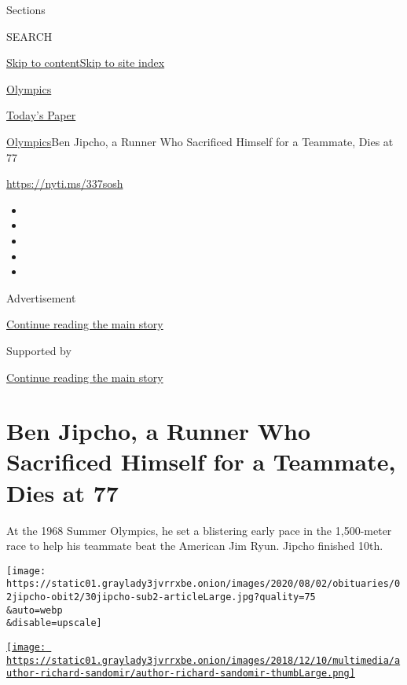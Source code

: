 Sections

SEARCH

\protect\hyperlink{site-content}{Skip to
content}\protect\hyperlink{site-index}{Skip to site index}

\href{https://www.nytimes3xbfgragh.onion/section/sports/olympics}{Olympics}

\href{https://myaccount.nytimes3xbfgragh.onion/auth/login?response_type=cookie\&client_id=vi}{}

\href{https://www.nytimes3xbfgragh.onion/section/todayspaper}{Today's
Paper}

\href{/section/sports/olympics}{Olympics}\textbar{}Ben Jipcho, a Runner
Who Sacrificed Himself for a Teammate, Dies at 77

\url{https://nyti.ms/337sosh}

\begin{itemize}
\item
\item
\item
\item
\item
\end{itemize}

Advertisement

\protect\hyperlink{after-top}{Continue reading the main story}

Supported by

\protect\hyperlink{after-sponsor}{Continue reading the main story}

\hypertarget{ben-jipcho-a-runner-who-sacrificed-himself-for-a-teammate-dies-at-77}{%
\section{Ben Jipcho, a Runner Who Sacrificed Himself for a Teammate,
Dies at
77}\label{ben-jipcho-a-runner-who-sacrificed-himself-for-a-teammate-dies-at-77}}

At the 1968 Summer Olympics, he set a blistering early pace in the
1,500-meter race to help his teammate beat the American Jim Ryun. Jipcho
finished 10th.

\texttt{[image: https://static01.graylady3jvrrxbe.onion/images/2020/08/02/obituaries/02jipcho-obit2/30jipcho-sub2-articleLarge.jpg?quality=75\\\&auto=webp\\\&disable=upscale]}

\href{https://www.nytimes3xbfgragh.onion/by/richard-sandomir}{\texttt{[image: https://static01.graylady3jvrrxbe.onion/images/2018/12/10/multimedia/author-richard-sandomir/author-richard-sandomir-thumbLarge.png]}}

